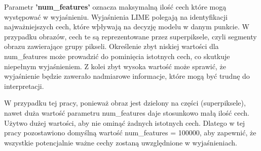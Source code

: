 Parametr \textbf{'num\_features'} oznacza maksymalną ilość cech które mogą występować w wyjaśnieniu.
Wyjaśnienia LIME polegają na identyfikacji najważniejszych cech, które wþływają na decyzję modelu w danym punkcie.
W przypadku obrazów, cech te są reprezentowane przez superpiksele, czyli segmenty obrazu zawierające grupy pikseli.
Określenie zbyt niskiej wartości dla num\_features może prowadzić do pominięcia istotnych cech, co skutkuje niepełnym wyjaśnieniem.
Z kolei zbyt wysoka wartość może sprawić, że wyjaśnienie będzie zawerało nadmiarowe informacje, które mogą być trudnę do interpretacji.

W przypadku tej pracy, ponieważ obraz jest dzielony na części (superpiksele), nawet duża wartość parametru num\_features daje stosunkowo małą ilość cech.
Użytwo dużej wartości, aby nie ominąć żadnych istotnych cech.
Dlatego w tej pracy pozostawiono domyślną wartość num\_features = 100000, aby zapewnić, że wszystkie potencjalnie ważne cechy zostaną uwzględnione w wyjaśnieniach.

